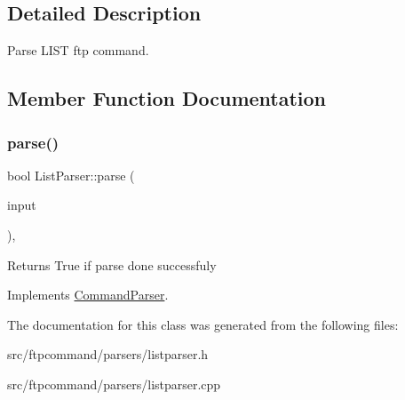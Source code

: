 \subsection{Detailed Description}
Parse L\+I\+ST ftp command. 

\subsection{Member Function Documentation}
\mbox{\label{classListParser_ad26061c7101e88d72fc86ccec6cc13a6}} 
\subsubsection{\texorpdfstring{parse()}{parse()}}
{\footnotesize\ttfamily bool List\+Parser\+::parse (\begin{DoxyParamCaption}\item[{const Q\+String \&}]{input }\end{DoxyParamCaption})\hspace{0.3cm}{\ttfamily [override]}, {\ttfamily [virtual]}}

\begin{DoxyReturn}{Returns}
True if parse done successfuly 
\end{DoxyReturn}


Implements \hyperlink{classCommandParser_a5ed0855947a9b4500329f29b8123f2ea}{Command\+Parser}.



The documentation for this class was generated from the following files\+:\begin{DoxyCompactItemize}
\item 
src/ftpcommand/parsers/listparser.\+h\item 
src/ftpcommand/parsers/listparser.\+cpp\end{DoxyCompactItemize}
